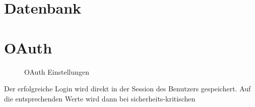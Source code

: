 
\section{Datenbank}


\section{OAuth}
\label{oauth}


\begin{figure}[H]
\caption{OAuth Einstellungen}
\end{figure}

Der erfolgreiche Login wird direkt in der Session des Benutzers gespeichert.
Auf die entsprechenden Werte wird dann bei sicherheits-kritischen